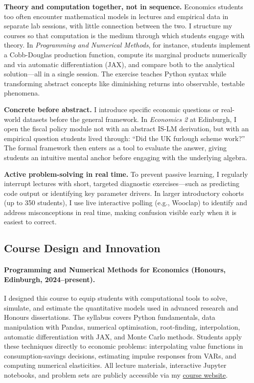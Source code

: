 \documentclass[12pt,a4paper]{article}
\begin{document}
\textbf{Theory and computation together, not in sequence.} Economics students too often encounter mathematical models in lectures and empirical data in separate lab sessions, with little connection between the two. I structure my courses so that computation is the medium through which students engage with theory. In \textit{Programming and Numerical Methods}, for instance, students implement a Cobb-Douglas production function, compute its marginal products numerically and via automatic differentiation (JAX), and compare both to the analytical solution---all in a single session. The exercise teaches Python syntax while transforming abstract concepts like diminishing returns into observable, testable phenomena.

\textbf{Concrete before abstract.} I introduce specific economic questions or real-world datasets before the general framework. In \textit{Economics 2} at Edinburgh, I open the fiscal policy module not with an abstract IS-LM derivation, but with an empirical question students lived through: ``Did the UK furlough scheme work?'' The formal framework then enters as a tool to evaluate the answer, giving students an intuitive mental anchor before engaging with the underlying algebra.

\textbf{Active problem-solving in real time.} To prevent passive learning, I regularly interrupt lectures with short, targeted diagnostic exercises---such as predicting code output or identifying key parameter drivers. In larger introductory cohorts (up to 350 students), I use live interactive polling (e.g., Wooclap) to identify and address misconceptions in real time, making confusion visible early when it is easiest to correct.

\subsection*{Course Design and Innovation}
\vspace{-0.3cm}

\paragraph{Programming and Numerical Methods for Economics (Honours, Edinburgh, 2024--present).}
I designed this course to equip students with computational tools to solve, simulate, and estimate the quantitative models used in advanced research and Honours dissertations. The syllabus covers Python fundamentals, data manipulation with Pandas, numerical optimisation, root-finding, interpolation, automatic differentiation with JAX, and Monte Carlo methods. Students apply these techniques directly to economic problems: interpolating value functions in consumption-savings decisions, estimating impulse responses from VARs, and computing numerical elasticities. All lecture materials, interactive Jupyter notebooks, and problem sets are publicly accessible via my \href{https://juanignaciozurita.github.io/personalwebsite/courses/pnm/index.html}{course website}.
\end{document}
